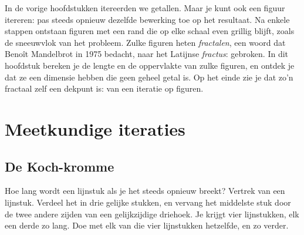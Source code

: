 
In de vorige hoofdstukken itereerden we getallen. Maar je kunt ook een figuur itereren: pas steeds opnieuw dezelfde bewerking toe op het resultaat. Na enkele stappen ontstaan figuren met een rand die op elke schaal even grillig blijft, zoals de sneeuwvlok van het probleem. Zulke figuren heten \emph{fractalen}, een woord dat Benoît Mandelbrot in 1975 bedacht, naar het Latijnse \textit{fractus}: gebroken. In dit hoofdstuk bereken je de lengte en de oppervlakte van zulke figuren, en ontdek je dat ze een dimensie hebben die geen geheel getal is. Op het einde zie je dat zo'n fractaal zelf een dekpunt is: van een iteratie op figuren.

\begin{oefeningen}[Start]

\end{oefeningen}

\section{Meetkundige iteraties}

\subsection{De Koch-kromme}

Hoe lang wordt een lijnstuk als je het steeds opnieuw breekt? Vertrek van een lijnstuk. Verdeel het in drie gelijke stukken, en vervang het middelste stuk door de twee andere zijden van een gelijkzijdige driehoek. Je krijgt vier lijnstukken, elk een derde zo lang. Doe met elk van die vier lijnstukken hetzelfde, en zo verder.


